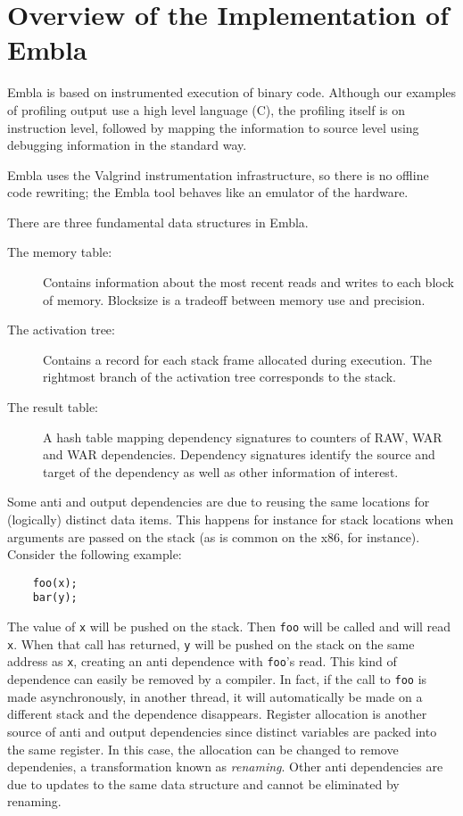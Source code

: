 \section{Overview of the Implementation of Embla}

Embla is based on instrumented execution of binary code. Although
our examples of profiling output use a high level language (C),
the profiling itself is on instruction level, followed by 
mapping the information to source level using debugging information 
in the standard way.

Embla uses the Valgrind instrumentation infrastructure, so there
is no offline code rewriting; the Embla tool behaves like an emulator
of the hardware.

There are three fundamental data structures in Embla.
\begin{description}
\item[The memory table:]
Contains information about the most recent reads and writes to each
block of memory. Blocksize is a tradeoff between memory use and 
precision. 
\item[The activation tree:]
Contains a record for each stack frame allocated during execution. 
The rightmost branch of the activation tree corresponds to the stack.
\item[The result table:]
A hash table mapping dependency signatures to counters of RAW, WAR 
and WAR dependencies. Dependency signatures identify the source and
target of the dependency as well as other information of interest.
\end{description}

Some anti and output dependencies are due to reusing the same
locations for (logically) distinct data items. This happens for
instance for stack locations when arguments are passed on the stack
(as is common on the x86, for instance). Consider the following
example:
\begin{verbatim}
    foo(x);
    bar(y);
\end{verbatim}
The value of {\tt x} will be pushed on the stack. Then {\tt foo} will
be called and will read {\tt x}. When that call has returned, {\tt y}
will be pushed on the stack on the same address as {\tt x}, creating
an anti dependence with {\tt foo}'s read. This kind of dependence can 
easily be removed by a
compiler. In fact, if the call to {\tt foo} is made asynchronously, in
another thread, it will automatically be made on a different stack and
the dependence disappears. Register allocation is another source of
anti and output dependencies since distinct variables are packed into
the same register. In this case, the allocation can be changed to
remove dependenies, a transformation known as {\em renaming}. 
Other anti dependencies are due to updates
to the same data structure and cannot be eliminated by renaming.

